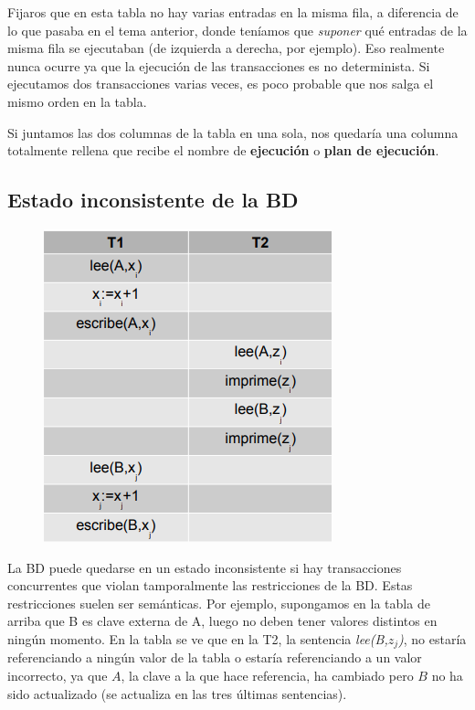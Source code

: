 Fijaros que en esta tabla no hay varias entradas en la misma fila, a diferencia de lo que pasaba en el tema anterior, donde teníamos que \textit{suponer} qué entradas de la misma fila se ejecutaban (de izquierda a derecha, por ejemplo). Eso realmente nunca ocurre ya que la ejecución de las transacciones es no determinista. Si ejecutamos dos transacciones varias veces, es poco probable que nos salga el mismo orden en la tabla.

Si juntamos las dos columnas de la tabla en una sola, nos quedaría una columna totalmente rellena que recibe el nombre de \textbf{ejecución} o \textbf{plan de ejecución}.

\subsection{Estado inconsistente de la BD}

\begin{figure}[H]
  \center
  \includegraphics[scale=0.5]{img/23.png}
\end{figure}

La BD puede quedarse en un estado inconsistente si hay transacciones concurrentes que violan tamporalmente las restricciones de la BD. Estas restricciones suelen ser semánticas. Por ejemplo, supongamos en la tabla de arriba que B es clave externa de A, luego no deben tener valores distintos en ningún momento. En la tabla se ve que en la T2, la sentencia \textit{lee(B,$z_j$)}, no estaría referenciando a ningún valor de la tabla o estaría referenciando a un valor incorrecto, ya que $A$, la clave a la que hace referencia, ha cambiado pero $B$ no ha sido actualizado (se actualiza en las tres últimas sentencias).

